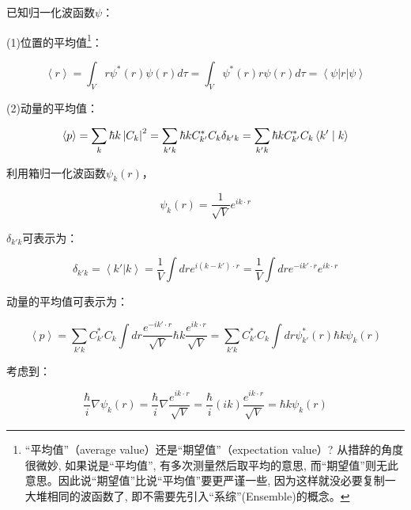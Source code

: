 已知归一化波函数$\psi$：

(1)位置的平均值\footnote{``平均值''（average
value）还是``期望值''（expectation value）? 从措辞的角度很微妙,
如果说是``平均值'', 有多次测量然后取平均的意思,
而``期望值''则无此意思。因此说``期望值''比说``平均值''要更严谨一些,
因为这样就没必要复制一大堆相同的波函数了,
即不需要先引入``系综''(Ensemble)的概念。}：

\begin{equation}
\left\langle r \right\rangle  = \int_V {r\psi ^* (r)\psi (r)d\tau  = \int_V {\psi ^* (r)r\psi (r)d\tau }  = \left\langle \psi  \right|} r\left| \psi  \right\rangle 
\end{equation}

(2)动量的平均值：

\begin{equation}
\left\langle p \right\rangle = \sum\limits_k {\hbar k\left| {C_k } \right|^2 }  = \sum\limits_{k'k} {\hbar kC_{k'} ^* C_k \delta _{k'k} }  = \sum\limits_{k'k} {\hbar kC_{k'} ^* C_k \left\langle {{k'}}
 \mathrel{\left | {\vphantom {{k'} k}}
 \right. \kern-\nulldelimiterspace}
 {k} \right\rangle } 
\end{equation}

利用箱归一化波函数$\psi _k (r)$，

\begin{equation}
\psi _k (r)  = \frac{1}{{\sqrt V }}e^{ik \cdot r}
\end{equation}

$\delta _{k'k}$可表示为：

\begin{equation}
\delta _{k'k} = \left\langle k' | k  \right\rangle = \frac{1}{V} \int dr e^{i(k - k') \cdot r} = \frac{1}{V} \int dr e^{-i k' \cdot r} e^{i k \cdot r} 
\end{equation}

动量的平均值可表示为：

\begin{equation}
\left\langle p \right\rangle = \sum\limits_{k' k} C^*_{k'} C_k \int dr \frac{e^{-i k' \cdot r}}{ \sqrt{V}} \hbar k \frac{e^{i k \cdot r}}{ \sqrt{V}}  = \sum\limits_{k' k} C^*_{k'} C_k \int dr  \psi^*_{k'} (r)  \hbar k \psi_k (r)
\end{equation}

考虑到：

\begin{equation}
\frac{\hbar }{i}\nabla \psi_k(r)  = \frac{\hbar }{i}\nabla \frac{e^{ik \cdot r}}{{\sqrt V }}  = \frac{\hbar }{i}(ik)\frac{ e^{ik \cdot r} }{{\sqrt V }}  = \hbar k\psi _k(r) 
\end{equation}

